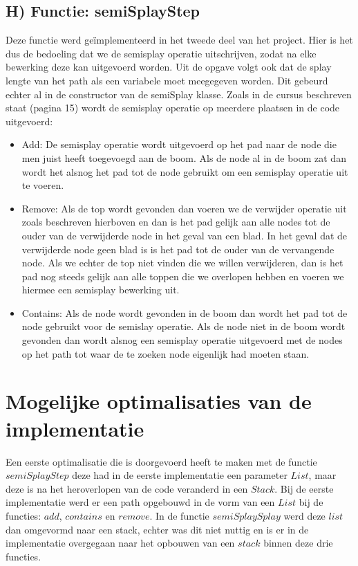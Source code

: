 \documentclass[dutch, 11pt]{report}
\begin{document}
\subsection*{H) Functie: semiSplayStep}
Deze functie werd geïmplementeerd in het tweede deel van het project. Hier is het dus de bedoeling dat we de semisplay operatie uitschrijven, zodat na elke bewerking deze kan uitgevoerd worden. Uit de opgave volgt ook dat de splay lengte van het path als een variabele moet meegegeven worden. Dit gebeurd echter al in de constructor van de semiSplay klasse. Zoals in de cursus beschreven staat (pagina 15) wordt de semisplay operatie op meerdere plaatsen in de code uitgevoerd:

\begin{itemize}
	\item Add: De semisplay operatie wordt uitgevoerd op het pad naar de node die men juist heeft toegevoegd aan de boom. Als de node al in de boom zat dan wordt het alsnog het pad tot de node gebruikt om een semisplay operatie uit te voeren.
	\item Remove: Als de top wordt gevonden dan voeren we de verwijder operatie uit zoals beschreven hierboven en dan is het pad gelijk aan alle nodes tot de ouder van de verwijderde node in het geval van een blad. In het geval dat de verwijderde node geen blad is is het pad tot de ouder van de vervangende node. Als we echter de top niet vinden die we willen verwijderen, dan is het pad nog steeds gelijk aan alle toppen die we overlopen hebben en voeren we hiermee een semisplay bewerking uit.
	\item Contains: Als de node wordt gevonden in de boom dan wordt het pad tot de node gebruikt voor de semislay operatie. Als de node niet in de boom wordt gevonden dan wordt alsnog een semisplay operatie uitgevoerd met de nodes op het path tot waar de te zoeken node eigenlijk had moeten staan.
\end{itemize}

\section*{Mogelijke optimalisaties van de implementatie}
Een eerste optimalisatie die is doorgevoerd heeft te maken met de functie $semiSplayStep$ deze had in de eerste implementatie een parameter $List$, maar deze is na het heroverlopen van de code veranderd in een $Stack$. Bij de eerste implementatie werd er een path opgebouwd in de vorm van een $List$ bij de functies: $add$, $contains$ en $remove$. In de functie $semiSplaySplay$ werd deze $list$ dan omgevormd naar een stack, echter was dit niet nuttig en is er in de implementatie overgegaan naar het opbouwen van een $stack$ binnen deze drie functies. 
\newpage
\end{document}
